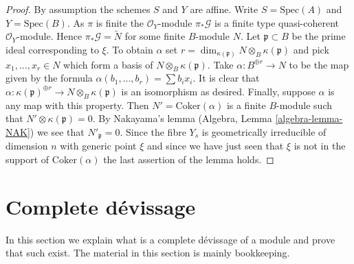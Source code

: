 \begin{proof}
By assumption the schemes $S$ and $Y$ are affine.
Write $S = \text{Spec}(A)$ and $Y = \text{Spec}(B)$.
As $\pi$ is finite the $\mathcal{O}_Y$-module $\pi_*\mathcal{G}$
is a finite type quasi-coherent $\mathcal{O}_Y$-module.
Hence $\pi_*\mathcal{G} = \widetilde{N}$ for some finite $B$-module $N$.
Let $\mathfrak p \subset B$ be the prime ideal corresponding to $\xi$.
To obtain $\alpha$ set
$r = \dim_{\kappa(\mathfrak p)} N \otimes_B \kappa(\mathfrak p)$
and pick $x_1, \ldots, x_r \in N$ which form a basis of
$N \otimes_B \kappa(\mathfrak p)$. Take $\alpha : B^{\oplus r} \to N$
to be the map given by the formula $\alpha(b_1, \ldots, b_r) = \sum b_ix_i$.
It is clear that
$\alpha : \kappa(\mathfrak p)^{\oplus r} \to N \otimes_B \kappa(\mathfrak p)$
is an isomorphism as desired. Finally, suppose $\alpha$ is any map with this
property. Then $N' = \text{Coker}(\alpha)$ is a finite $B$-module
such that $N' \otimes \kappa(\mathfrak p) = 0$. By Nakayama's lemma
(Algebra, Lemma \ref{algebra-lemma-NAK})
we see that $N'_{\mathfrak p} = 0$. Since the fibre $Y_s$ is
geometrically irreducible of dimension $n$ with generic point $\xi$
and since we have just seen that $\xi$ is not in the support of
$\text{Coker}(\alpha)$ the last assertion of the lemma holds.
\end{proof}


\section{Complete d\'evissage}
\label{section-complete-devissage}

\noindent
In this section we explain what is a complete d\'evissage of a
module and prove that such exist. The material in this
section is mainly bookkeeping.

